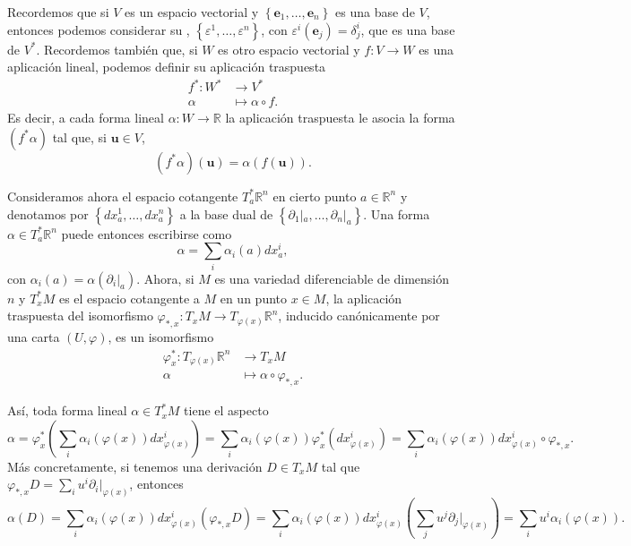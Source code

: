 \documentclass[12pt,a4paper]{book}
\theoremstyle{definition} \newtheorem{defn}[thm]{Definición}
\theoremstyle{definition} \newtheorem{ejemplo}[thm]{Ejemplo}
\theoremstyle{definition} \newtheorem{ejercicio}[thm]{Ejercicio}
\theoremstyle{remark} \newtheorem*{obs}{Observación}
\def\RR{\mathbb{R}}
\def\eps{\varepsilon}
\newcommand{\ve}[1]{\mathbf{#1}}
\let\emph\relax
\begin{document}
	       Recordemos que si $V$ es un espacio vectorial y $\left\{ \ve{e}_1,\dots,\ve{e}_n \right\}$ es una base de $V$, entonces podemos considerar su \emph{base dual}, $\left\{ \eps^1,\dots,\eps^n \right\}$, con $\eps^i(\ve{e}_j)=\delta^i_j$, que es una base de $V^*$. Recordemos también que, si $W$ es otro espacio vectorial y $f:V\rightarrow W$ es una aplicación lineal, podemos definir su aplicación traspuesta 
	       \begin{align*}
		 f^* :W^*&\longrightarrow V^*\\ 
		   \alpha  &\longmapsto \alpha \circ f. 
		 \end{align*}
	       Es decir, a cada forma lineal $\alpha:W\rightarrow \RR$ la aplicación traspuesta le asocia la forma $(f^*\alpha)$ tal que, si $\ve{u} \in V$, 
	       \begin{equation*}
		 (f^*\alpha)(\ve{u})=\alpha(f(\ve{u})).
	       \end{equation*}

	       Consideramos ahora el espacio cotangente $T_a^*\RR^n$ en cierto punto $a\in \RR^n$ y denotamos por $\left\{ dx^1_a,\dots,dx^n_a \right\}$ a la base dual de $\left\{ \partial_1|_a,\dots,\partial_n|_a \right\}$. Una forma $\alpha \in T_a^*\RR^n$ puede entonces escribirse como 
	       \begin{equation*}
		 \alpha=\sum_i \alpha_i(a) dx^i_a,
	       \end{equation*}
	       con $\alpha_i(a)=\alpha(\partial_i|_a)$.
	       Ahora, si $M$ es una variedad diferenciable de dimensión $n$ y $T^*_xM$ es el espacio cotangente a $M$ en un punto $x\in M$, la aplicación traspuesta del isomorfismo $\varphi_{*,x}:T_xM \rightarrow T_{\varphi(x)}\RR^n$, inducido canónicamente por una carta $(U,\varphi)$, es un isomorfismo
	       \begin{align*}
		 \varphi^*_x :T_{\varphi(x)}\RR^n &\longrightarrow T_x M\\ 
		 \alpha &\longmapsto \alpha \circ \varphi_{*,x}. 
		 \end{align*}

		 Así, toda forma lineal $\alpha \in T_x^*M$ tiene el aspecto
		 \begin{equation*}
		   \alpha = \varphi^*_x\left(\sum_i \alpha_i(\varphi(x)) dx^i_{\varphi(x)}\right)=\sum_i \alpha_i(\varphi(x)) \varphi^*_x(dx^i_{\varphi(x)})=\sum_i \alpha_i (\varphi(x)) dx^i_{\varphi(x)} \circ \varphi_{*,x}.
		 \end{equation*}
		 Más concretamente, si tenemos una derivación $D\in T_xM$ tal que $\varphi_{*,x} D=\sum_i u^i\partial_i |_{\varphi(x)}$, entonces
		 \begin{equation*}
		   \alpha(D) = \sum_i \alpha_i(\varphi(x)) dx^i_{\varphi(x)}(\varphi_{*,x} D) = \sum_i \alpha_i(\varphi(x)) dx^i_{\varphi(x)}\left(\sum_j u^j \partial_j|_{\varphi(x)}\right)= \sum_i u^i \alpha_i(\varphi(x)).
		 \end{equation*}
\end{document}
